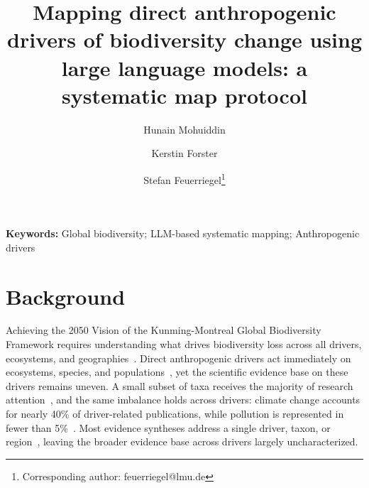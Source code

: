 \documentclass[12pt]{article}
\begin{document}
\title{\centering\LARGE\singlespacing
Mapping direct anthropogenic drivers of biodiversity change using large language models: a systematic map protocol}

\renewcommand\Affilfont{\fontsize{9}{10.8}\selectfont}

\author[1]{Hunain Mohuiddin}
\author[1,2]{Kerstin Forster}
\author[1,2]{Stefan Feuerriegel\thanks{Corresponding author:
feuerriegel@lmu.de}}

\date{}
\maketitle
\vspace{-1cm}
\noindent\textbf{Keywords:} Global biodiversity; LLM-based systematic mapping; Anthropogenic drivers
\newpage
\linenumbers
 
\section*{Background}
Achieving the 2050 Vision of the Kunming-Montreal Global Biodiversity Framework requires understanding what drives biodiversity loss across all drivers, ecosystems, and geographies~\cite{spm_ga_ipbes_2019}. Direct anthropogenic drivers act immediately on ecosystems, species, and populations~\cite{diaz_ipbes_2015,spm_ga_ipbes_2019}, yet the scientific evidence base on these drivers remains uneven. A small subset of taxa receives the majority of research attention~\cite{troudet2017taxonomic}, and the same imbalance holds across drivers: climate change accounts for nearly 40\% of driver-related publications, while pollution is represented in fewer than 5\%~\cite{mazor_et_all_mismatch_of_policy}. Most evidence syntheses address a single driver, taxon, or region~\cite{moullec_identifying_2021,jaureguiberry_direct_2022, beckmann_conventional_2019,benitez-lopez_impact_2017,urban_accelerating_2015}, leaving the broader evidence base across drivers largely uncharacterized.
\end{document}
